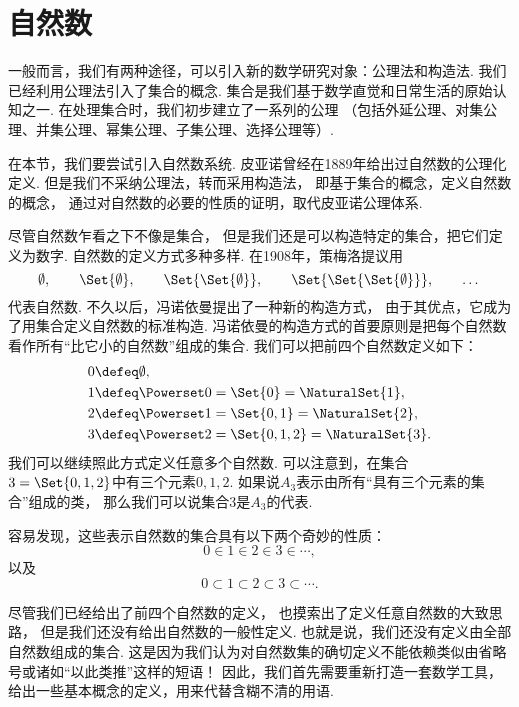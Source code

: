 \section{自然数}
一般而言，我们有两种途径，可以引入新的数学研究对象：公理法和构造法.
我们已经利用公理法引入了集合的概念.
集合是我们基于数学直觉和日常生活的原始认知之一.
在处理集合时，我们初步建立了一系列的公理%
（包括外延公理、对集公理、并集公理、幂集公理、子集公理、选择公理等）.

在本节，我们要尝试引入自然数系统.
皮亚诺曾经在1889年给出过自然数的公理化定义.
但是我们不采纳公理法，转而采用构造法，
即基于集合的概念，定义自然数的概念，
通过对自然数的必要的性质的证明，取代皮亚诺公理体系.

尽管自然数乍看之下不像是集合，
但是我们还是可以构造特定的集合，把它们定义为数字.
自然数的定义方式多种多样.
在1908年，策梅洛提议用\begin{equation*}
	\emptyset, \qquad
	\Set{\emptyset}, \qquad
	\Set{\Set{\emptyset}}, \qquad
	\Set{\Set{\Set{\emptyset}}}, \qquad
	\dotsc
\end{equation*}代表自然数.
不久以后，冯诺依曼提出了一种新的构造方式，
由于其优点，它成为了用集合定义自然数的标准构造.
冯诺依曼的构造方式的首要原则是把每个自然数看作所有“比它小的自然数”组成的集合.
我们可以把前四个自然数定义如下：\begin{align*}
	&0 \defeq \emptyset, \\
	&1 \defeq \Powerset0 = \Set{0} = \NaturalSet{1}, \\
	&2 \defeq \Powerset1 = \Set{0,1} = \NaturalSet{2}, \\
	&3 \defeq \Powerset2 = \Set{0,1,2} = \NaturalSet{3}.
\end{align*}
我们可以继续照此方式定义任意多个自然数.
可以注意到，在集合\(3=\Set{0,1,2}\)中有三个元素\(0,1,2\).
如果说\(A_3\)表示由所有“具有三个元素的集合”组成的类，
那么我们可以说集合\(3\)是\(A_3\)的代表.

容易发现，这些表示自然数的集合具有以下两个奇妙的性质：\begin{equation*}
	0 \in 1 \in 2 \in 3 \in \dotsb,
\end{equation*}
以及\begin{equation*}
	0 \subset 1 \subset 2 \subset 3 \subset \dotsb.
\end{equation*}

尽管我们已经给出了前四个自然数的定义，
也摸索出了定义任意自然数的大致思路，
但是我们还没有给出自然数的一般性定义.
也就是说，我们还没有定义由全部自然数组成的集合.
这是因为我们认为对自然数集的确切定义不能依赖类似由省略号或诸如“以此类推”这样的短语！
因此，我们首先需要重新打造一套数学工具，给出一些基本概念的定义，用来代替含糊不清的用语.


